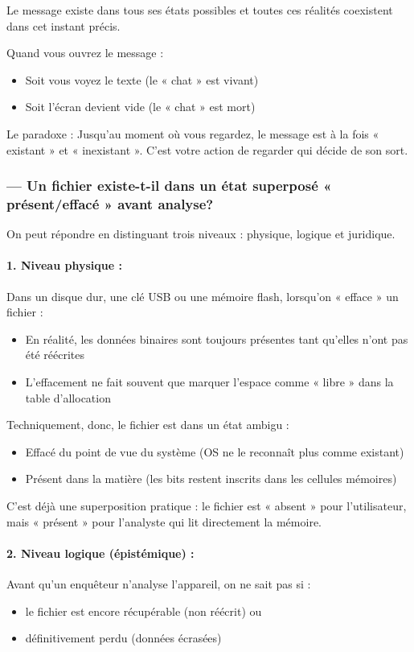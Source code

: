 \documentclass[12pt]{article}
\begin{document}
Le message existe dans tous ses états possibles et toutes ces réalités coexistent dans cet instant précis.

Quand vous ouvrez le message :
\begin{itemize}
\item Soit vous voyez le texte (le « chat » est vivant)
\item Soit l'écran devient vide (le « chat » est mort)
\end{itemize}

Le paradoxe : Jusqu'au moment où vous regardez, le message est à la fois « existant » et « inexistant ». C'est votre action de regarder qui décide de son sort.

\subsubsection*{— Un fichier existe-t-il dans un état superposé « présent/effacé » avant analyse?}

On peut répondre en distinguant trois niveaux : physique, logique et juridique.

\paragraph{1. Niveau physique :}
Dans un disque dur, une clé USB ou une mémoire flash, lorsqu'on « efface » un fichier :
\begin{itemize}
\item En réalité, les données binaires sont toujours présentes tant qu'elles n'ont pas été réécrites
\item L'effacement ne fait souvent que marquer l'espace comme « libre » dans la table d'allocation
\end{itemize}

Techniquement, donc, le fichier est dans un état ambigu :
\begin{itemize}
\item Effacé du point de vue du système (OS ne le reconnaît plus comme existant)
\item Présent dans la matière (les bits restent inscrits dans les cellules mémoires)
\end{itemize}

C'est déjà une superposition pratique : le fichier est « absent » pour l'utilisateur, mais « présent » pour l'analyste qui lit directement la mémoire.

\paragraph{2. Niveau logique (épistémique) :}
Avant qu'un enquêteur n'analyse l'appareil, on ne sait pas si :
\begin{itemize}
\item le fichier est encore récupérable (non réécrit) ou
\item définitivement perdu (données écrasées)
\end{itemize}
\end{document}
